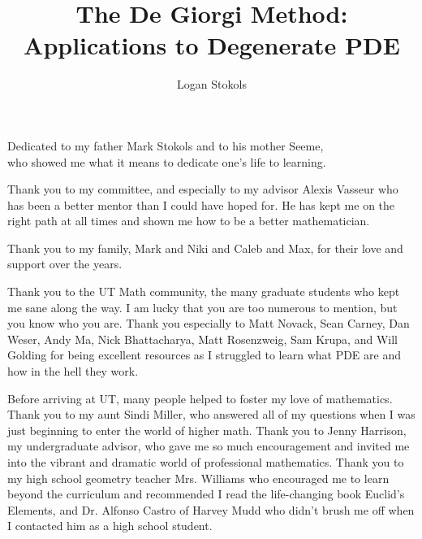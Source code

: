 \documentclass[11pt]{report}	%
\author{Logan Stokols}  	%
\title{The De Giorgi Method: Applications to Degenerate PDE}
\theoremstyle{definition}
\theoremstyle{remark}
\begin{document}
\copyrightpage          %


%
%
%
\commcertpage           %

\titlepage              %



%
\begin{dedication}
%
Dedicated to my father Mark Stokols and to his mother Seeme, \\who showed me what it means to dedicate one's life to learning.
\end{dedication}


\begin{acknowledgments}		%
%
Thank you to my committee, and especially to my advisor Alexis Vasseur who has been a better mentor than I could have hoped for.  He has kept me on the right path at all times and shown me how to be a better mathematician.  

Thank you to my family, Mark and Niki and Caleb and Max, for their love and support over the years.  

Thank you to the UT Math community, the many graduate students who kept me sane along the way.  I am lucky that you are too numerous to mention, but you know who you are. Thank you especially to Matt Novack, Sean Carney, Dan Weser, Andy Ma, Nick Bhattacharya, Matt Rosenzweig, Sam Krupa, and Will Golding for being excellent resources as I struggled to learn what PDE are and how in the hell they work.  

Before arriving at UT, many people helped to foster my love of mathematics.  Thank you to my aunt Sindi Miller, who answered all of my questions when I was just beginning to enter the world of higher math.  Thank you to Jenny Harrison, my undergraduate advisor, who gave me so much encouragement and invited me into the vibrant and dramatic world of professional mathematics. Thank you to my high school geometry teacher Mrs. Williams who encouraged me to learn beyond the curriculum and recommended I read the life-changing book Euclid's Elements, and Dr. Alfonso Castro of Harvey Mudd who didn't brush me off when I contacted him as a high school student.  
\end{acknowledgments}
\end{document}
